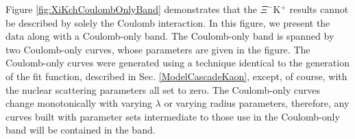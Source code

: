 \documentclass[/home/jesse/Analysis/FemtoAnalysis/AnalysisNotes/AnalysisNoteJBuxton.tex]{subfiles}
\begin{document}

Figure \ref{fig:XiKchCoulombOnlyBand} demonstrates that the $\Xi^{-}$K$^{+}$ results cannot be described by solely the Coulomb interaction.  
In this figure, we present the data along with a Coulomb-only band.  The Coulomb-only band is spanned by two Coulomb-only curves, whose parameters are given in the figure. 
The Coulomb-only curves were generated using a technique identical to the generation of the fit function, described in Sec. \ref{ModelCascadeKaon}, except, of course, with the nuclear scattering parameters all set to zero.  
The Coulomb-only curves change monotonically with varying $\lambda$ or varying radius parameters, therefore, any curves built with parameter sets intermediate to those use in the Coulomb-only band will be contained in the band.
\end{document}
